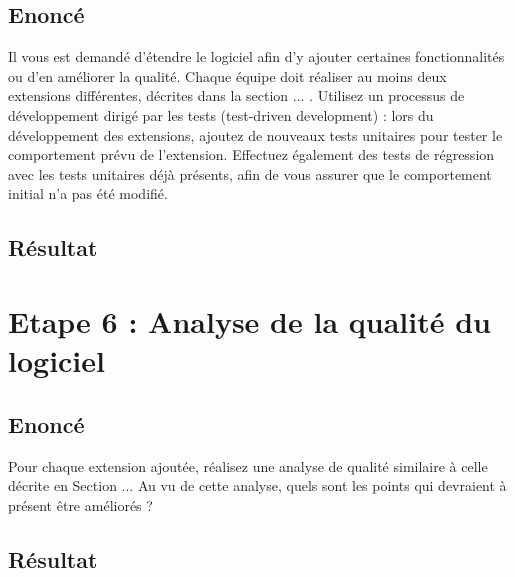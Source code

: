 \documentclass[12pt,a4paper,final]{article}
\begin{document}
\subsection{Enoncé} 
Il vous est demandé d'étendre le logiciel afin d'y ajouter certaines fonctionnalités ou d'en améliorer la qualité. Chaque équipe doit réaliser au moins deux extensions différentes, décrites dans la section ... .
Utilisez un processus de développement dirigé par les tests (test-driven development) : lors du développement des extensions, ajoutez de nouveaux tests unitaires pour tester le comportement prévu de l'extension. Effectuez également des tests de régression avec les tests unitaires déjà présents, afin de vous assurer que le comportement initial n'a pas été modifié.
\subsection{Résultat}

































\newpage
\section{Etape 6 : Analyse de la qualité du logiciel}\label{sec:etape6}
\subsection{Enoncé} 
Pour chaque extension ajoutée, réalisez une analyse de qualité similaire à celle décrite en Section ... Au vu de cette analyse, quels sont les points qui devraient à présent être améliorés ?
\subsection{Résultat}
\end{document}
